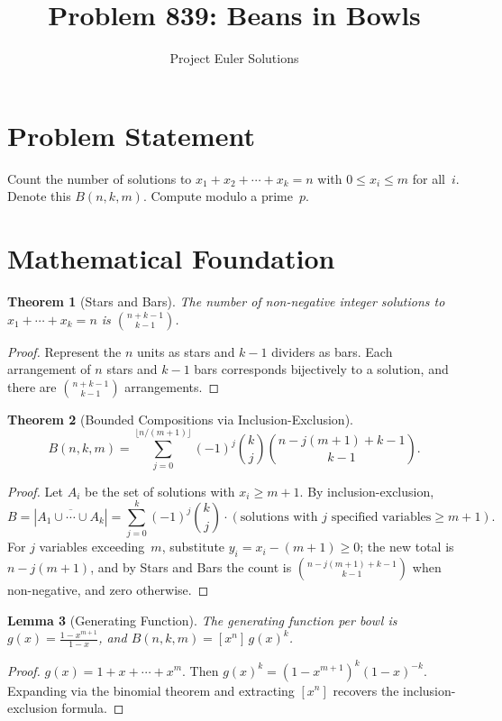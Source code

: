 \documentclass[11pt]{article}
\title{Problem 839: Beans in Bowls}
\author{Project Euler Solutions}
\date{}
\newtheorem{theorem}{Theorem}
\newtheorem{lemma}[theorem]{Lemma}
\begin{document}
\maketitle

\section{Problem Statement}

Count the number of solutions to $x_1+x_2+\cdots+x_k=n$ with $0\le x_i\le m$ for all~$i$. Denote this $B(n,k,m)$. Compute modulo a prime~$p$.

\section{Mathematical Foundation}

\begin{theorem}[Stars and Bars]
The number of non-negative integer solutions to $x_1+\cdots+x_k=n$ is $\binom{n+k-1}{k-1}$.
\end{theorem}

\begin{proof}
Represent the $n$ units as stars and $k-1$ dividers as bars. Each arrangement of $n$ stars and $k-1$ bars corresponds bijectively to a solution, and there are $\binom{n+k-1}{k-1}$ arrangements.
\end{proof}

\begin{theorem}[Bounded Compositions via Inclusion-Exclusion]
\[
B(n,k,m) = \sum_{j=0}^{\lfloor n/(m+1)\rfloor}(-1)^j\binom{k}{j}\binom{n-j(m+1)+k-1}{k-1}.
\]
\end{theorem}

\begin{proof}
Let $A_i$ be the set of solutions with $x_i\ge m+1$. By inclusion-exclusion,
\[
B = \left|\overline{A_1\cup\cdots\cup A_k}\right| = \sum_{j=0}^{k}(-1)^j\binom{k}{j}\cdot(\text{solutions with }j\text{ specified variables}\ge m+1).
\]
For $j$ variables exceeding~$m$, substitute $y_i=x_i-(m+1)\ge 0$; the new total is $n-j(m+1)$, and by Stars and Bars the count is $\binom{n-j(m+1)+k-1}{k-1}$ when non-negative, and zero otherwise.
\end{proof}

\begin{lemma}[Generating Function]
The generating function per bowl is $g(x)=\frac{1-x^{m+1}}{1-x}$, and $B(n,k,m)=[x^n]\,g(x)^k$.
\end{lemma}

\begin{proof}
$g(x)=1+x+\cdots+x^m$. Then $g(x)^k=(1-x^{m+1})^k(1-x)^{-k}$. Expanding via the binomial theorem and extracting $[x^n]$ recovers the inclusion-exclusion formula.
\end{proof}
\end{document}
